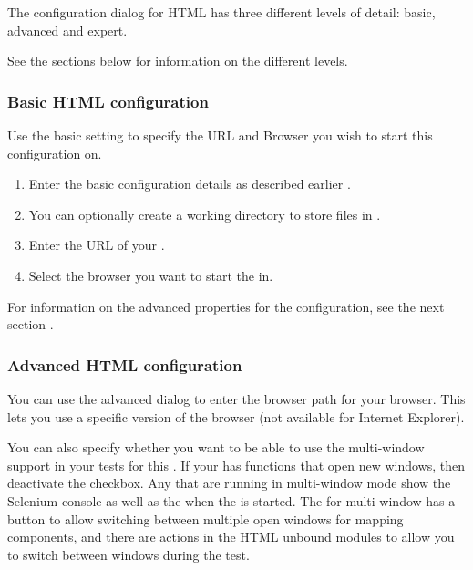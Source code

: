 

The \gdaut{} configuration dialog for HTML has three different levels of detail: basic, advanced and expert. 

See the sections below for information on the different levels. 

\subsubsection{Basic HTML \gdaut{} configuration}

Use the basic setting to specify the URL and Browser you wish to start this \gdaut{} configuration on. 

\begin{enumerate}
\item Enter the basic configuration details as described earlier .
\item You can optionally create a working directory to store files in . 
\item Enter the URL of your \gdaut{}.
\item Select the browser you want to start the \gdaut{} in.
\end{enumerate}
For information on the advanced properties for the \gdaut{} configuration, see the next section . 

\subsubsection{Advanced HTML \gdaut{} configuration}
\label{AdvancedAUTConfigHTML}

You can use the advanced dialog to enter the browser path for your browser. This lets you use a specific version of the browser (not available for Internet Explorer). 

You can also specify whether you want to be able to use the multi-window support in your tests for this \gdaut{}. If your \gdaut{} has functions that open new windows, then deactivate the  checkbox. Any \gdauts{} that are running in multi-window mode show the Selenium console as well as the \gdaut{} when the \gdaut{} is started. The \gdomeditor{} for multi-window \gdauts{} has a button to allow switching between multiple open windows for mapping components, and there are  actions in the HTML unbound modules to allow you to switch between windows during the test. 

